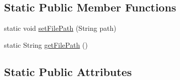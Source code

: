 \subsection*{Static Public Member Functions}
\begin{DoxyCompactItemize}
\item 
static void \hyperlink{classit_1_1emarolab_1_1cagg_1_1debugging_1_1CaggLoggersManager_a76d643f5dd354a9c58046479e24bb83b}{set\-File\-Path} (String path)
\item 
static String \hyperlink{classit_1_1emarolab_1_1cagg_1_1debugging_1_1CaggLoggersManager_ac58d81011327bd27256ef73cdb8ce073}{get\-File\-Path} ()
\end{DoxyCompactItemize}
\subsection*{Static Public Attributes}
